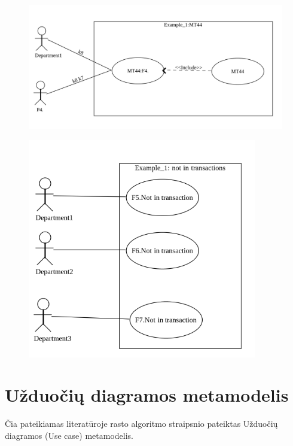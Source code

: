 \documentclass{VUMIFInfBakalaurinis}
\begin{document}
\begin{figure}[H]
    \centering
    \includegraphics[width=12cm]{img/appendix/run_examples/generated_use_case/mt44}
\end{figure}
\begin{figure}[H]
    \centering
    \includegraphics[width=10cm]{img/appendix/run_examples/generated_use_case/not_in_transaction}
\end{figure}

\section{Užduočių diagramos metamodelis} \label{appendix:lit_alg_metamodels_uc}

Čia pateikiamas literatūroje rasto algoritmo straipsnio \cite{algUseCasesFromBpmn} pateiktas Užduočių diagramos (Use case) metamodelis.
\end{document}
